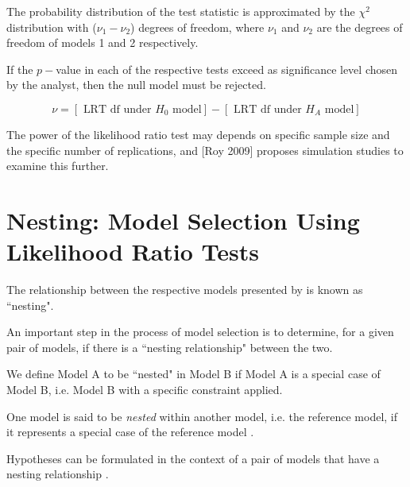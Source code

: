 \documentclass[12pt, a4paper]{report}
\theoremstyle{plain}
\theoremstyle{definition}
\theoremstyle{remark}
\begin{document}
The probability distribution of the test statistic is approximated by the $\chi^2$ distribution with ($\nu_{1} - \nu_{2}$) degrees of freedom, where $\nu_{1}$  and $\nu_{2}$ are the degrees of freedom of models 1 and 2 respectively.

If the $p-$value in each of the respective tests exceed as significance level chosen by the analyst, then the null model must be rejected.


\begin{equation}
\nu = [\mbox{ LRT df under }H_{0} \mbox{ model}] - [\mbox{ LRT df under }H_{A} \mbox{ model}]
\end{equation}

The power of the likelihood ratio test may depends on specific sample size and the specific number of replications, and [Roy 2009] proposes simulation studies to examine this further.




\section{Nesting: Model Selection Using Likelihood Ratio Tests}
The relationship between the respective models presented by \citet{roy} is known as ``nesting".

An important step in the process of model selection is to determine, for a given pair of models, if there is a ``nesting relationship" between the two.

We define Model A to be ``nested" in Model B if Model A is a special case of Model B, i.e. Model B with a specific constraint applied.

One model is said to be \emph{nested} within another model, i.e. the reference model, if it represents a special case of the reference model \citep{PB}.

Hypotheses can be formulated in the context of a pair of models that have a nesting relationship \citet{west}.






%
%
\end{document}
